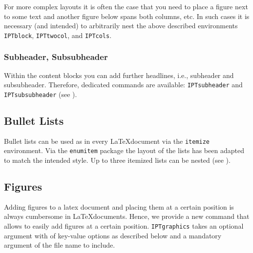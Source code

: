 
For more complex layouts it is often the case that you need to place a figure next to some text and another figure below spans both columns, etc. In such cases it is necessary (and intended) to arbitrarily nest the above described environments \texttt{IPTblock}, \texttt{IPTtwocol}, and \texttt{IPTcols}.


\subsubsection{Subheader, Subsubheader} %
\label{ssub:subheader_subsubheader}

Within the content blocks you can add further headlines, i.e., subheader and subsubheader. Therefore, dedicated commands are available: \texttt{\bs{}IPTsubheader} and \texttt{\bs{}IPTsubsubheader} (see ).



\subsection{Bullet Lists}

Bullet lists can be used as in every \LaTeX document via the \texttt{itemize} environment. Via the \texttt{enumitem} package the layout of the lists has been adapted to match the intended style. Up to three itemized lists can be nested (see ).



\subsection{Figures}

Adding figures to a latex document and placing them at a certain position is always cumbersome in \LaTeX documents. Hence, we provide a new command \texttt{} that allows to easily add figures at a certain position. 
\texttt{IPTgraphics} takes an optional argument with of key-value options as described below and a mandatory argument of the file name to include.


